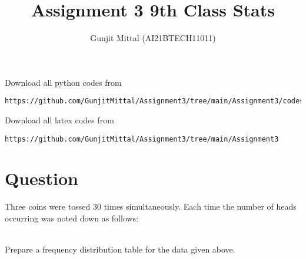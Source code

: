 \documentclass[journal,12pt,twocolumn]{IEEEtran}
\begin{document}
\let\vec\mathbf{}
\def\putbox#1#2#3{\makebox[0in][l]{\makebox[#1][l]{}\raisebox{\baselineskip}[0in][0in]{\raisebox{#2}[0in][0in]{#3}}}}
     \def\rightbox#1{\makebox[0in][r]{#1}}
     \def\centbox#1{\makebox[0in]{#1}}
     \def\topbox#1{\raisebox{-\baselineskip}[0in][0in]{#1}}
     \def\midbox#1{\raisebox{-0.5\baselineskip}[0in][0in]{#1}}
\vspace{3cm}
\title{Assignment 3 9th Class Stats}
\author{Gunjit Mittal (AI21BTECH11011)}
\maketitle
Download all python codes from 
\begin{lstlisting}
https://github.com/GunjitMittal/Assignment3/tree/main/Assignment3/codes
\end{lstlisting}
Download all latex codes from 
\begin{lstlisting}
https://github.com/GunjitMittal/Assignment3/tree/main/Assignment3 
\end{lstlisting} 
\section{Question}
Three coins were tossed 30 times simultaneously. Each time the number of heads
occurring was noted down as follows:\\  
\begin{table}[ht!]
    \centering
    \label{table:table1}	 
    \caption{}
    \label{Table 1}
\end{table}   \\
Prepare a frequency distribution table for the data given above.\\
\end{document}
